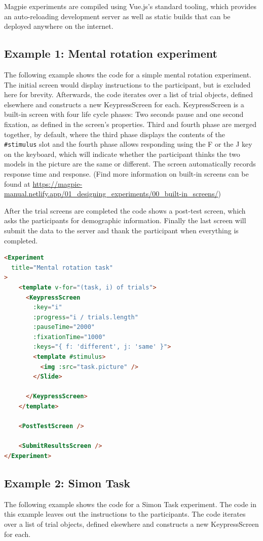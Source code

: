 \documentclass[a4paper,11pt]{scrreprt}
\begin{document}
Magpie experiments are compiled using Vue.js's standard tooling, which provides an auto-reloading development server as well as static builds that can be deployed anywhere on the internet.

\subsection{Example 1: Mental rotation experiment}
The following example shows the code for a simple mental rotation experiment. The initial screen would display instructions to the participant, but is excluded here for brevity. Afterwards, the code iterates over a list of trial objects, defined elsewhere and constructs a new KeypressScreen for each. KeypressScreen is a built-in screen with four life cycle phases: Two seconds pause and one second fixation, as defined in the screen's properties. Third and fourth phase are merged together, by default, where the third phase displays the contents of the \texttt{\#stimulus} slot and the fourth phase allows responding using the F or the J key on the keyboard, which will indicate whether the participant thinks the two models in the picture are the same or different. The screen automatically records response time and response. (Find more information on built-in screens can be found at \url{https://magpie-manual.netlify.app/01_designing_experiments/00_built-in_screens/})

After the trial screens are completed the code shows a post-test screen, which asks the participants for demographic information. Finally the last screen will submit the data to the server and thank the participant when everything is completed.

\begin{lstlisting}[language=html]
<Experiment
  title="Mental rotation task"
>
    <template v-for="(task, i) of trials">
      <KeypressScreen
        :key="i"
        :progress="i / trials.length"
        :pauseTime="2000"
        :fixationTime="1000"
        :keys="{ f: 'different', j: 'same' }">
        <template #stimulus>
          <img :src="task.picture" />
        </Slide>
        
      </KeypressScreen>
    </template>

    <PostTestScreen />

    <SubmitResultsScreen />
</Experiment>
\end{lstlisting}


\subsection{Example 2: Simon Task}
The following example shows the code for a Simon Task experiment. The code in this example leaves out the instructions to the participants. The code iterates over a list of trial objects, defined elsewhere and constructs a new KeypressScreen for each.
\end{document}

